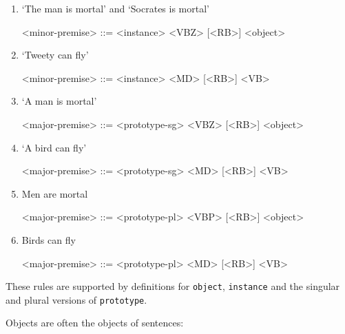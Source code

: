 \begin{enumerate}
    \item `The man is mortal' and `Socrates is mortal'
    \begin{grammar}
        <minor-premise> ::= <instance> <VBZ> [<RB>] <object>
    \end{grammar}
    \item `Tweety can fly'
    \begin{grammar}
        <minor-premise> ::= <instance> <MD> [<RB>] <VB>
    \end{grammar}

    \item `A man is mortal'
    \begin{grammar}
        <major-premise> ::= <prototype-sg> <VBZ> [<RB>] <object>
    \end{grammar}
    \item `A bird can fly'
    \begin{grammar}
        <major-premise> ::= <prototype-sg> <MD> [<RB>] <VB>
    \end{grammar}
    \item Men are mortal
    \begin{grammar}
        <major-premise> ::= <prototype-pl> <VBP> [<RB>] <object>
    \end{grammar}
    \item Birds can fly
    \begin{grammar}
        <major-premise> ::= <prototype-pl> <MD> [<RB>] <VB>
    \end{grammar}
\end{enumerate}

These rules are supported by definitions for \texttt{object}, \texttt{instance} and the singular and plural versions of \texttt{prototype}. 

Objects are often the objects of sentences:

